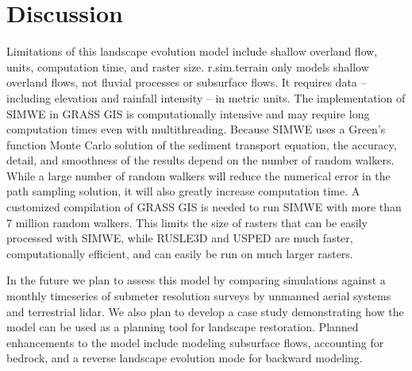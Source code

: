 \documentclass[gmd, manuscript]{copernicus}
\providecommand{\DIFadd}[1]{{\protect\color{blue} \sf #1}} %
\providecommand{\DIFaddbegin}{} %
\begin{document}
\DIFaddbegin \section{\DIFadd{Discussion}}

\DIFadd{Limitations of this landscape evolution model include
shallow overland flow, units, computation time, and raster size.
r.sim.terrain only models shallow overland flows, 
not fluvial processes or subsurface flows.
It requires data -- including 
elevation and rainfall intensity -- in metric units. 
The implementation of SIMWE in GRASS GIS
is computationally intensive 
and may require long computation times even with multithreading.
Because SIMWE uses a Green's function Monte Carlo solution 
of the sediment transport equation, 
the accuracy, detail, and smoothness of the results 
depend on the number of random walkers.
While a large number of random walkers will reduce the
numerical error in the path sampling solution,
it will also greatly increase computation time.
A customized compilation of GRASS GIS 
is needed to run SIMWE with more than 7 million random walkers.
This limits the size of rasters 
that can be easily processed with SIMWE,
while RUSLE3D and USPED are much faster, computationally efficient,
and can easily be run on much larger rasters. 
}


\DIFadd{In the future we plan to assess this model
by comparing simulations against 
a monthly timeseries
of submeter resolution surveys
by unmanned aerial systems and terrestrial lidar. 
We also plan to develop a case study demonstrating
how the model can be used as a planning tool 
for landscape restoration. 
Planned enhancements to the model include 
modeling subsurface flows, 
accounting for bedrock, 
and a reverse landscape evolution mode
for backward modeling. 
}
\end{document}
